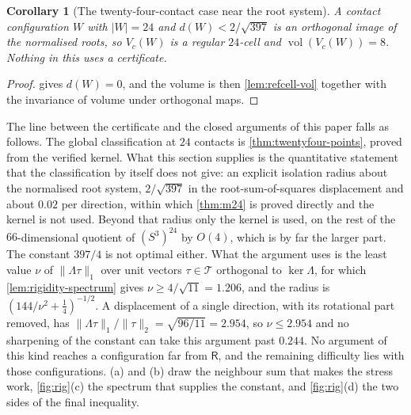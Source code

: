 \documentclass[11pt,reqno]{amsart}
\renewcommand{\_}{\origunderscore\allowbreak}
\numberwithin{equation}{section}
\theoremstyle{plain}
\newtheorem{cor}[thm]{Corollary}
\theoremstyle{definition}
\theoremstyle{remark}
\newcommand{\Rt}{\mathsf{R}}                 %
\DeclareMathOperator{\vol}{vol}
\begin{document}
\begin{cor}[The twenty-four-contact case near the root
system]\label{cor:m24-local}
A contact configuration $W$ with $|W|=24$ and $d(W)<2/\sqrt{397}$ is an
orthogonal image of the normalised roots, so $V_c(W)$ is a regular
$24$-cell and $\vol(V_c(W))=8$. Nothing in this uses a certificate.
\end{cor}

\begin{proof}
 gives $d(W)=0$, and the volume is then
\cref{lem:refcell-vol} together with the invariance of volume under
orthogonal maps.
\end{proof}

The line between the certificate and the closed arguments of this
paper falls as follows. The global classification at
$24$ contacts is \cref{thm:twentyfour-points}, proved from the verified
kernel. What this section supplies is the quantitative statement that
the classification by itself does not give: an explicit isolation
radius about the normalised root system, $2/\sqrt{397}$ in the
root-sum-of-squares displacement and about $0.02$ per direction,
within which \cref{thm:m24} is proved directly and the kernel is not
used. Beyond that radius only the kernel is used, on the rest of the
$66$-dimensional quotient of $(S^3)^{24}$ by $O(4)$, which is by far the
larger part. The constant $397/4$ is not optimal either. What the
argument uses is the least value $\nu$ of $\|\Lambda\tau\|_1$ over
unit vectors $\tau\in\mathcal{T}$ orthogonal to $\ker\Lambda$, for which
\cref{lem:rigidity-spectrum} gives $\nu\ge4/\sqrt{11}=1.206$, and the radius is
$(144/\nu^2+\tfrac14)^{-1/2}$. A displacement of a single direction, with its
rotational part removed, has $\|\Lambda\tau\|_1/\|\tau\|_2=\sqrt{96/11}=2.954$, so
$\nu\le2.954$ and no sharpening of the constant can take this argument past
$0.244$. No argument of this kind
reaches a configuration far from $\Rt$, and the remaining difficulty lies
with those configurations.
(a) and (b) draw the neighbour sum that makes the stress
work, \cref{fig:rig}(c) the spectrum that supplies the constant, and
\cref{fig:rig}(d) the two sides of the final inequality.
\end{document}
